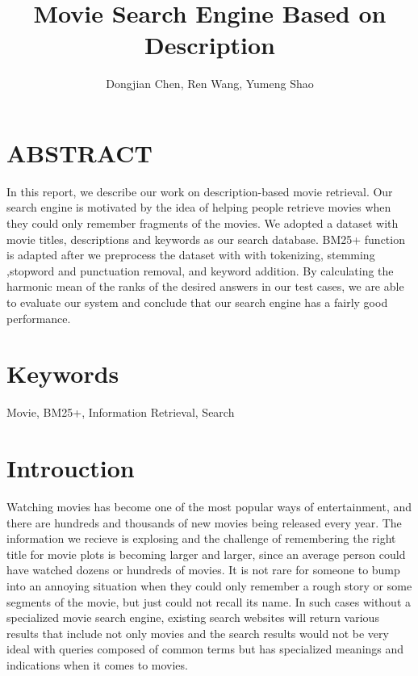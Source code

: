 \documentclass[letterpaper,10pt]{article}
\title{Movie Search Engine Based on Description}
\author{Dongjian Chen, Ren Wang, Yumeng Shao}
\begin{document}
\maketitle



\begin{multicols}{2}
    \section*{ABSTRACT}
    In this report, we describe our work on description-based movie retrieval. Our search engine is motivated by the idea of helping people retrieve movies when they could only remember fragments of the movies. We adopted a dataset with movie titles, descriptions and keywords as our search database. BM25+ function is adapted after we preprocess the dataset with with tokenizing, stemming ,stopword and punctuation removal, and keyword addition. By calculating the harmonic mean of the ranks of the desired answers in our test cases, we are able to evaluate our system and conclude that our search engine has a fairly good performance.

    \section*{Keywords}

    Movie, BM25+, Information Retrieval, Search

    \vfill\null
    \columnbreak


    \section{Introuction}

    Watching movies has become one of the most popular ways of entertainment, and there are hundreds and thousands of new movies being released every year. The information we recieve is explosing and the challenge of remembering the right title for movie plots is becoming larger and larger, since an average person could have watched dozens or hundreds of movies. It is not rare for someone to bump into an annoying situation when they could only remember a rough story or some segments of the movie, but just could not recall its name. In such cases without a specialized movie search engine, existing search websites will return various results that include not only movies and the search results would not be very ideal with queries composed of common terms but has specialized meanings and indications when it comes to movies.


\end{multicols}
\end{document}
